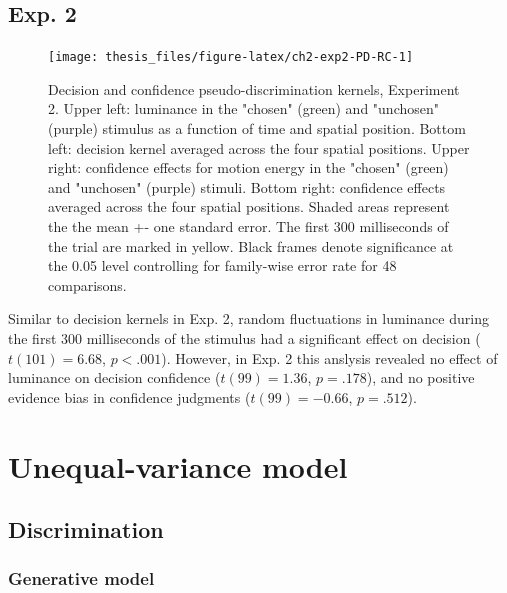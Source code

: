 \documentclass[12pt,twoside]{reedthesis}
\begin{document}
\hypertarget{exp.-2}{%
\subsection{Exp. 2}\label{exp.-2}}
\begin{figure}
\texttt{[image: thesis\_files/figure-latex/ch2-exp2-PD-RC-1]} \caption[Pseudo-discrimination kernels for detection signal trials.]{Decision and confidence pseudo-discrimination kernels, Experiment 2. Upper left: luminance in the "chosen" (green) and "unchosen" (purple) stimulus as a function of time and spatial position. Bottom left: decision kernel averaged across the four spatial positions. Upper right: confidence effects for motion energy in the "chosen" (green) and "unchosen" (purple) stimuli. Bottom right: confidence effects averaged across the four spatial positions. Shaded areas represent the the mean +- one standard error. The first 300 milliseconds of the trial are marked in yellow. Black frames denote significance at the 0.05 level controlling for family-wise error rate for 48 comparisons.}\label{fig:ch2-exp2-PD-RC}
\end{figure}
Similar to decision kernels in Exp. 2, random fluctuations in luminance during the first 300 milliseconds of the stimulus had a significant effect on decision (\(t(101) = 6.68\), \(p < .001\)). However, in Exp. 2 this anslysis revealed no effect of luminance on decision confidence (\(t(99) = 1.36\), \(p = .178\)), and no positive evidence bias in confidence judgments (\(t(99) = -0.66\), \(p = .512\)).

\hypertarget{app2:simulation}{%
\section{Unequal-variance model}\label{app2:simulation}}

\hypertarget{discrimination}{%
\subsection{Discrimination}\label{discrimination}}

\hypertarget{generative-model}{%
\subsubsection*{Generative model}\label{generative-model}}
\end{document}
